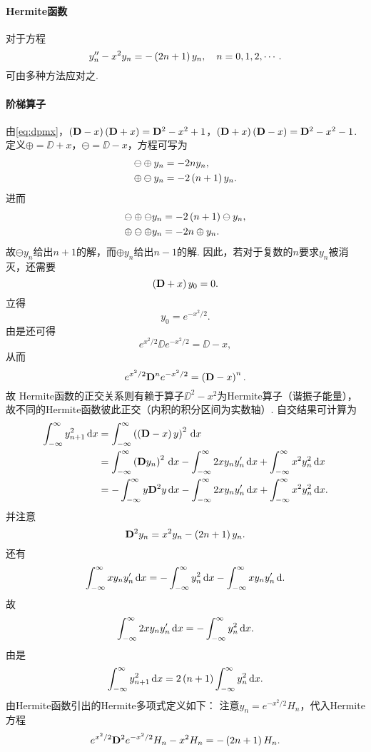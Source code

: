 \documentclass[UTF-8]{ctexart}
\begin{document}
  \paragraph{Hermite函数}对于方程
  \[ y''_n-x^2y_n = -\left(2n+1\right)y_n,\quad n=0,1,2,\cdots. \]
  可由多种方法应对之.
  \paragraph{阶梯算子}由\eqref{eq:dpmx}，$\left(\mathbf{D}-x\right)\left(\mathbf{D}+x\right)=\mathbf{D}^2-x^2+1$，$\left(\mathbf{D}+x\right)\left(\mathbf{D}-x\right)=\mathbf{D}^2-x^2-1$. 定义$\oplus=\DD+x$，$\ominus=\DD-x$，方程可写为
  \begin{align*}
    \ominus\oplus y_n &= -2ny_n,\\
    \oplus\ominus y_n &= -2\left(n+1\right)y_n.
  \end{align*}
  进而
  \begin{align*}
    \ominus\oplus\ominus y_n &= -2\left(n+1\right)\ominus y_n,\\
    \oplus\ominus\oplus y_n &= -2n\oplus y_n.
  \end{align*}
  故$\ominus y_n$给出$n+1$的解，而$\oplus y_n$给出$n-1$的解. 因此，若对于复数的$n$要求$y_n$被消灭，还需要
  \[ \left(\mathbf{D}+x\right)y_0 = 0. \]
  立得
  \[ y_0 = e^{-x^2/2}. \]
  由是还可得
  \[ e^{x^2/2}\DD e^{-x^2/2} = \DD -x, \]
  从而
  \[ e^{x^2/2}\mathbf{D}^n e^{-x^2/2} = \left(\mathbf{D} -x\right)^n. \]
  故
  Hermite函数的正交关系则有赖于算子$\DD^2-x^2$为Hermite算子（谐振子能量），故不同的Hermite函数彼此正交（内积的积分区间为实数轴）. 自交结果可计算为
  \begin{align*}
    \int_{-\infty}^{\infty} y^2_{n+1} \, \mathrm{d} x &= \int_{-\infty}^{\infty} \left(\left(\mathbf{D}-x\right)y\right)^2 \, \mathrm{d} x\\
    &= \int_{-\infty}^{\infty} \left(\mathbf{D} y_n\right)^2 \, \mathrm{d} x - \int_{-\infty}^{\infty} 2xy_ny'_n \, \mathrm{d} x+\int_{-\infty}^{\infty} x^2y^2_n \, \mathrm{d} x\\
    &= -\int_{-\infty}^{\infty} y\mathbf{D}^2y \, \mathrm{d} x - \int_{-\infty}^{\infty} 2xy_ny'_n \, \mathrm{d} x+\int_{-\infty}^{\infty} x^2y^2_n \, \mathrm{d} x.
  \end{align*}
  并注意
  \[ \mathbf{D}^2y_n = x^2y_n - \left(2n+1\right)y_n. \]
  还有
  \[ \int_{-\infty}^{\infty} xy_ny'_n \, \mathrm{d} x = -\int_{-\infty}^{\infty} y^2_n \, \mathrm{d} x - \int_{-\infty}^{\infty} xy_ny'_n \, \mathrm{d} . \]
  故
  \[ \int_{-\infty}^{\infty} 2xy_ny'_n \, \mathrm{d} x = -\int_{-\infty}^{\infty} y^2_n \, \mathrm{d} x. \]
  由是
  \[ \int_{-\infty}^{\infty} y^2_{n+1} \, \mathrm{d} x = 2\left(n+1\right)\int_{-\infty}^{\infty} y^2_{n} \, \mathrm{d} x. \]
  由Hermite函数引出的Hermite多项式定义如下：
  注意$y_n = e^{-x^2/2}H_n$，代入Hermite方程
  \[ e^{x^2/2}\mathbf{D}^2 e^{-x^2/2}H_n - x^2 H_n = -\left(2n+1\right)H_n. \]
\end{document}
